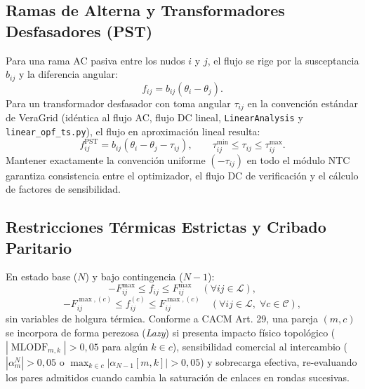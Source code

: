 \documentclass[11pt,a4paper]{article}
\begin{document}
\subsection{Ramas de Alterna y Transformadores Desfasadores (PST)}
Para una rama AC pasiva entre los nudos $i$ y $j$, el flujo se rige por la susceptancia $b_{ij}$ y la diferencia angular:
\begin{equation}
f_{ij} = b_{ij}(\theta_i - \theta_j).
\end{equation}
Para un transformador desfasador con toma angular $\tau_{ij}$ en la convención estándar de VeraGrid (idéntica al flujo AC, flujo DC lineal, \texttt{LinearAnalysis} y \texttt{linear\_opf\_ts.py}), el flujo en aproximación lineal resulta:
\begin{equation}
f_{ij}^{\text{PST}} = b_{ij}(\theta_i - \theta_j - \tau_{ij}), \qquad \tau_{ij}^{\min} \le \tau_{ij} \le \tau_{ij}^{\max}.
\end{equation}
Mantener exactamente la convención uniforme $(-\tau_{ij})$ en todo el módulo NTC garantiza consistencia entre el optimizador, el flujo DC de verificación y el cálculo de factores de sensibilidad.

\subsection{Restricciones Térmicas Estrictas y Cribado Paritario}
En estado base ($N$) y bajo contingencia ($N-1$):
\begin{equation}
-F_{ij}^{\max} \le f_{ij} \le F_{ij}^{\max} \quad (\forall ij \in \mathcal{L}),
\end{equation}
\begin{equation}
-F_{ij}^{\max, (c)} \le f_{ij}^{(c)} \le F_{ij}^{\max, (c)} \quad (\forall ij \in \mathcal{L}, \; \forall c \in \mathcal{C}),
\end{equation}
sin variables de holgura térmica. Conforme a CACM Art. 29, una pareja $(m, c)$ se incorpora de forma perezosa (\textit{Lazy}) si presenta impacto físico topológico ($|\operatorname{MLODF}_{m, k}| > 0{,}05$ para algún $k \in c$), sensibilidad comercial al intercambio ($|\alpha_m^N| > 0{,}05$ o $\max_{k \in c} |\alpha_{N-1}[m, k]| > 0{,}05$) y sobrecarga efectiva, re-evaluando los pares admitidos cuando cambia la saturación de enlaces en rondas sucesivas.
\end{document}
